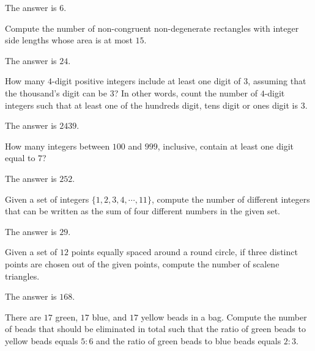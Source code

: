 \begin{solution}
The answer is $6$.
\end{solution}

\begin{problem}
Compute the number of non-congruent non-degenerate rectangles with integer side lengths whose area is at most $15$.
\end{problem}

\begin{solution}
The answer is $24$.
\end{solution}

\begin{problem}
How many $4$-digit positive integers include at least one digit of $3$, assuming that the thousand's digit can be $3$? In other words, count the number of $4$-digit integers such that at least one of the hundreds digit, tens digit or ones digit is $3$.
\end{problem}

\begin{solution}
The answer is $2439$.
\end{solution}

\begin{problem}
How many integers between $100$ and $999$, inclusive, contain at least one digit equal to $7$?
\end{problem}

\begin{solution}
The answer is $252$.
\end{solution}

\begin{problem}
Given a set of integers $\{1,2,3,4,\cdots,11\}$, compute the number of different integers that can be written as the sum of four different numbers in the given set.
\end{problem}

\begin{solution}
The answer is $29$.
\end{solution}

\begin{problem}
Given a set of $12$ points equally spaced around a round circle, if three distinct points are chosen out of the given points, compute the number of scalene triangles.
\end{problem}

\begin{solution}
The answer is $168$.
\end{solution}

\begin{problem}
There are $17$ green, $17$ blue, and $17$ yellow beads in a bag. Compute the number of beads that should be eliminated in total such that the ratio of green beads to yellow beads equals $5:6$ and the ratio of green beads to blue beads equals $2:3$.
\end{problem}


